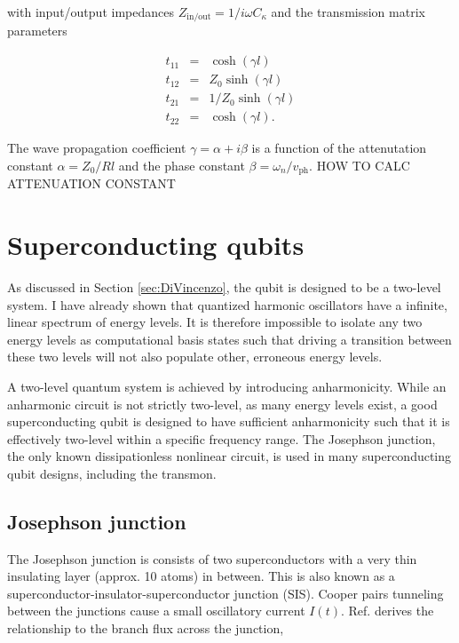 \documentclass[11 pt, oneside]{book} %
\begin{document}
with input/output impedances $Z_{\mathrm{in/out}}=1/i\omega C_\kappa$ and the transmission matrix parameters\cite{Goppl}

\begin{eqnarray}
t_{11} &=& \cosh(\gamma l) \\
t_{12} &=& Z_0\sinh(\gamma l) \\
t_{21} &=& 1/Z_0\sinh(\gamma l) \\
t_{22} &=& \cosh(\gamma l).
\end{eqnarray}

The wave propagation coefficient $\gamma=\alpha+i\beta$ is a function of the attenutation constant $\alpha=Z_0/Rl$ and the phase constant $\beta=\omega_n/v_{\mathrm{ph}}$. HOW TO CALC ATTENUATION CONSTANT

\section{Superconducting qubits}\label{sec:SuperconductingQubits}
As discussed in Section \ref{sec:DiVincenzo}, the qubit is designed to be a two-level system. I have already shown that quantized harmonic oscillators have a infinite, linear spectrum of energy levels. It is therefore impossible to isolate any two energy levels as computational basis states such that driving a transition between these two levels will not also populate other, erroneous energy levels. 

A two-level quantum system is achieved by introducing anharmonicity. While an anharmonic circuit is not strictly two-level, as many energy levels exist, a good superconducting qubit is designed to have sufficient anharmonicity such that it is effectively two-level within a specific frequency range. The Josephson junction\cite{Devoret2004}, the only known dissipationless nonlinear circuit, is used in many superconducting qubit designs, including the transmon. 
\subsection{Josephson junction}

The Josephson junction is consists of two superconductors with a very thin insulating layer (approx. 10 atoms) in between. This is also known as a superconductor-insulator-superconductor junction (SIS). Cooper pairs tunneling between the junctions cause a small oscillatory current $I(t)$. Ref. \cite{Tinkham} derives the relationship to the branch flux across the junction,
\end{document}
